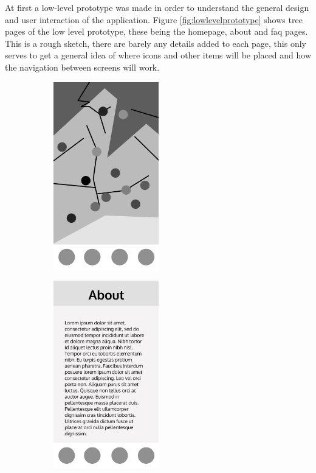 At first a low-level prototype was made in order to understand the
general design and user interaction of the application. Figure \ref{fig:lowlevelprototype}
shows tree pages of the low level prototype, these being the homepage, about
and faq pages. This is a rough sketch, there are barely any details added to each page,
this only serves to get a general idea of where icons and other items
will be placed and how the navigation between screens will work.

\begin{figure}
    \centering
    \begin{subfigure}{0.33\textwidth}
        \centering
        \includegraphics[width=130pt]{../assets/images/low_homepage.png}
        \caption{}
        \label{fig:lowhome}
    \end{subfigure}%
    \begin{subfigure}{0.33\textwidth}
        \centering
        \includegraphics[width=130pt]{../assets/images/low_about.png}
        \caption{}
        \label{fig:lowabout}

\end{subfigure}
\end{figure}
